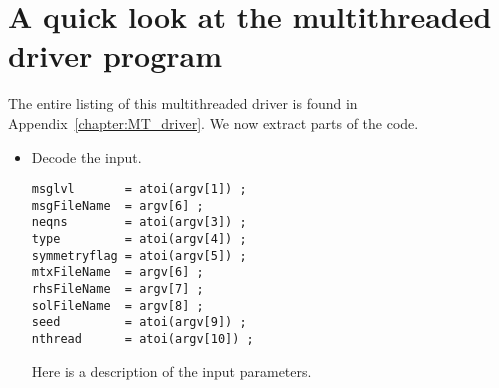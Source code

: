 \section{A quick look at the multithreaded driver program}
\label{section:BridgeMT:quick-look-MT-driver}
\par
The entire listing of this multithreaded driver is found in
Appendix~\ref{chapter:MT_driver}.
We now extract parts of the code.
\begin{itemize}
\item Decode the input.
\par
\begin{verbatim}
msglvl       = atoi(argv[1]) ;
msgFileName  = argv[6] ;
neqns        = atoi(argv[3]) ;
type         = atoi(argv[4]) ;
symmetryflag = atoi(argv[5]) ;
mtxFileName  = argv[6] ;
rhsFileName  = argv[7] ;
solFileName  = argv[8] ;
seed         = atoi(argv[9]) ;
nthread      = atoi(argv[10]) ;
\end{verbatim}
Here is a description of the input parameters.


\end{itemize}
